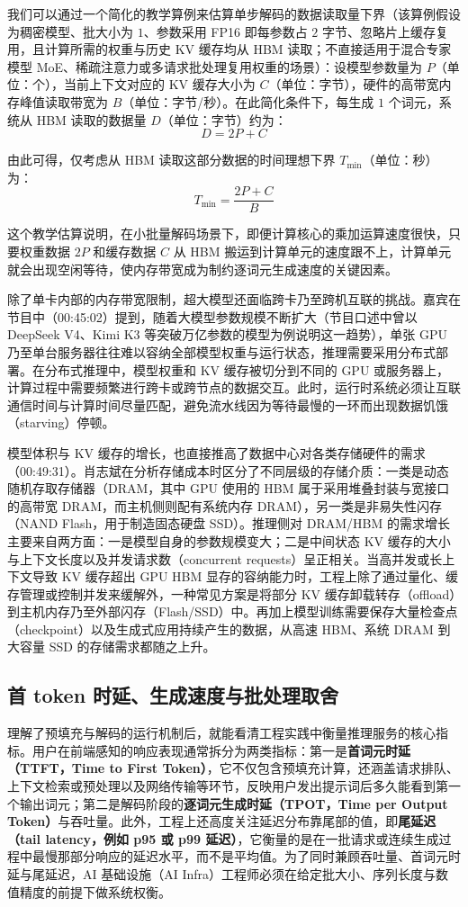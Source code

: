 \documentclass[UTF8,a4paper,11pt,fontset=fandol]{ctexart}
\begin{document}
我们可以通过一个简化的教学算例来估算单步解码的数据读取量下界（该算例假设为稠密模型、批大小为 \(1\)、参数采用 FP16 即每参数占 \(2\) 字节、忽略片上缓存复用，且计算所需的权重与历史 KV 缓存均从 HBM 读取；不直接适用于混合专家模型 MoE、稀疏注意力或多请求批处理复用权重的场景）：设模型参数量为 \(P\)（单位：个），当前上下文对应的 KV 缓存大小为 \(C\)（单位：字节），硬件的高带宽内存峰值读取带宽为 \(B\)（单位：字节/秒）。在此简化条件下，每生成 \(1\) 个词元，系统从 HBM 读取的数据量 \(D\)（单位：字节）约为：
\[
D = 2P + C
\]

由此可得，仅考虑从 HBM 读取这部分数据的时间理想下界 \(T_{\min}\)（单位：秒）为：
\[
T_{\min} = \frac{2P + C}{B}
\]

这个教学估算说明，在小批量解码场景下，即便计算核心的乘加运算速度很快，只要权重数据 \(2P\) 和缓存数据 \(C\) 从 HBM 搬运到计算单元的速度跟不上，计算单元就会出现空闲等待，使内存带宽成为制约逐词元生成速度的关键因素。

除了单卡内部的内存带宽限制，超大模型还面临跨卡乃至跨机互联的挑战。嘉宾在节目中（00:45:02）提到，随着大模型参数规模不断扩大（节目口述中曾以 DeepSeek V4、Kimi K3 等突破万亿参数的模型为例说明这一趋势），单张 GPU 乃至单台服务器往往难以容纳全部模型权重与运行状态，推理需要采用分布式部署。在分布式推理中，模型权重和 KV 缓存被切分到不同的 GPU 或服务器上，计算过程中需要频繁进行跨卡或跨节点的数据交互。此时，运行时系统必须让互联通信时间与计算时间尽量匹配，避免流水线因为等待最慢的一环而出现数据饥饿（starving）停顿。

模型体积与 KV 缓存的增长，也直接推高了数据中心对各类存储硬件的需求（00:49:31）。肖志斌在分析存储成本时区分了不同层级的存储介质：一类是动态随机存取存储器（DRAM，其中 GPU 使用的 HBM 属于采用堆叠封装与宽接口的高带宽 DRAM，而主机侧则配有系统内存 DRAM），另一类是非易失性闪存（NAND Flash，用于制造固态硬盘 SSD）。推理侧对 DRAM/HBM 的需求增长主要来自两方面：一是模型自身的参数规模变大；二是中间状态 KV 缓存的大小与上下文长度以及并发请求数（concurrent requests）呈正相关。当高并发或长上下文导致 KV 缓存超出 GPU HBM 显存的容纳能力时，工程上除了通过量化、缓存管理或控制并发来缓解外，一种常见方案是将部分 KV 缓存卸载转存（offload）到主机内存乃至外部闪存（Flash/SSD）中。再加上模型训练需要保存大量检查点（checkpoint）以及生成式应用持续产生的数据，从高速 HBM、系统 DRAM 到大容量 SSD 的存储需求都随之上升。

\subsection{首 token 时延、生成速度与批处理取舍}
理解了预填充与解码的运行机制后，就能看清工程实践中衡量推理服务的核心指标。用户在前端感知的响应表现通常拆分为两类指标：第一是\textbf{首词元时延（TTFT，Time to First Token）}，它不仅包含预填充计算，还涵盖请求排队、上下文检索或预处理以及网络传输等环节，反映用户发出提示词后多久能看到第一个输出词元；第二是解码阶段的\textbf{逐词元生成时延（TPOT，Time per Output Token）}与吞吐量。此外，工程上还高度关注延迟分布靠尾部的值，即\textbf{尾延迟（tail latency，例如 p95 或 p99 延迟）}，它衡量的是在一批请求或连续生成过程中最慢那部分响应的延迟水平，而不是平均值。为了同时兼顾吞吐量、首词元时延与尾延迟，AI 基础设施（AI Infra）工程师必须在给定批大小、序列长度与数值精度的前提下做系统权衡。
\end{document}

